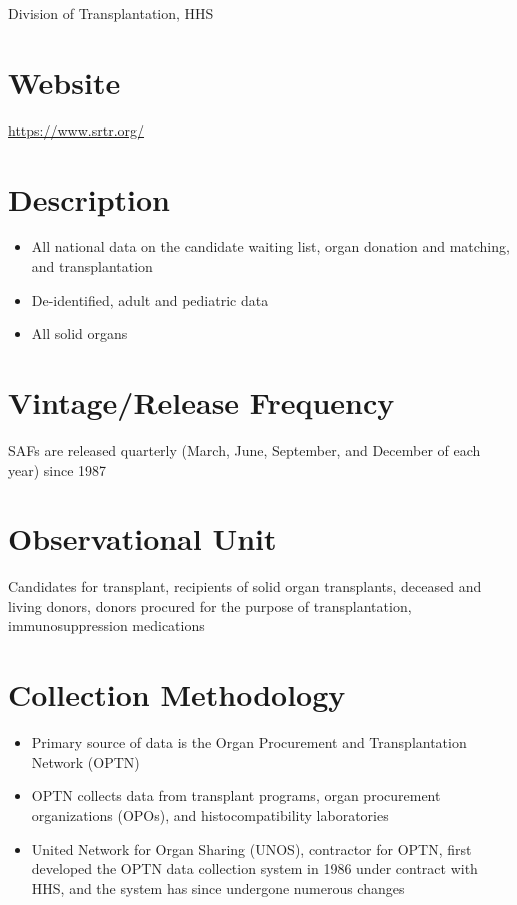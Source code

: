\documentclass[
]{book}
\providecommand{\tightlist}{%
  \setlength{\itemsep}{0pt}\setlength{\parskip}{0pt}}
\begin{document}
Division of Transplantation, HHS

\hypertarget{website-77}{%
\section{Website}\label{website-77}}

\url{https://www.srtr.org/}

\hypertarget{description-77}{%
\section{Description}\label{description-77}}

\begin{itemize}
\tightlist
\item
  All national data on the candidate waiting list, organ donation and matching, and transplantation
\item
  De-identified, adult and pediatric data
\item
  All solid organs
\end{itemize}

\hypertarget{vintagerelease-frequency-77}{%
\section{Vintage/Release Frequency}\label{vintagerelease-frequency-77}}

SAFs are released quarterly (March, June, September, and December of each year) since 1987

\hypertarget{observational-unit-77}{%
\section{Observational Unit}\label{observational-unit-77}}

Candidates for transplant, recipients of solid organ transplants, deceased and living donors, donors procured for the purpose of transplantation, immunosuppression medications

\hypertarget{collection-methodology-77}{%
\section{Collection Methodology}\label{collection-methodology-77}}

\begin{itemize}
\tightlist
\item
  Primary source of data is the Organ Procurement and Transplantation Network (OPTN)
\item
  OPTN collects data from transplant programs, organ procurement organizations (OPOs), and histocompatibility laboratories
\item
  United Network for Organ Sharing (UNOS), contractor for OPTN, first developed the OPTN data collection system in 1986 under contract with HHS, and the system has since undergone numerous changes
\end{itemize}
\end{document}
